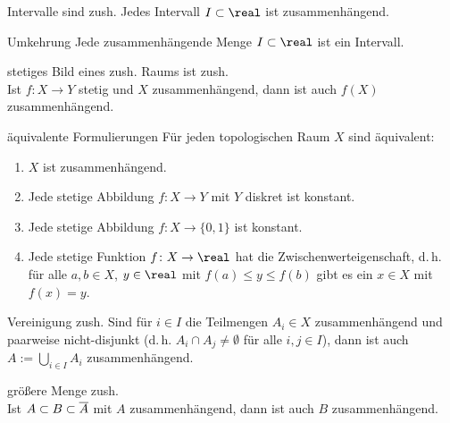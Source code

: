 \begin{Satz}{Intervalle sind zush.}
    Jedes Intervall $I \subset \real$ ist zusammenhängend.
\end{Satz}

\begin{Satz}{Umkehrung}
    Jede zusammenhängende Menge $I \subset \real$ ist ein Intervall.
\end{Satz}

\linie

\begin{Satz}{stetiges Bild eines zush. Raums ist zush.}\\
    Ist $f\colon X \rightarrow Y$ stetig und $X$ zusammenhängend,
    dann ist auch $f(X)$ zusammenhängend.
\end{Satz}

\begin{Satz}{äquivalente Formulierungen}
    Für jeden topologischen Raum $X$ sind äquivalent:
    \begin{enumerate}
        \item
        $X$ ist zusammenhängend.

        \item
        Jede stetige Abbildung $f\colon X \rightarrow Y$ mit $Y$ diskret
        ist konstant.

        \item
        Jede stetige Abbildung $f\colon X \rightarrow \{0, 1\}$
        ist konstant.

        \item
        Jede stetige Funktion $f\colon X \rightarrow \real$ hat die
        Zwischenwerteigenschaft, d.\,h.
        für alle $a, b \in X$, $y \in \real$ mit $f(a) \le y \le f(b)$ gibt
        es ein $x \in X$ mit $f(x) = y$.
    \end{enumerate}
\end{Satz}

\linie

\begin{Lemma}{Vereinigung zush.}
    Sind für $i \in I$ die Teilmengen $A_i \in X$ zusammenhängend und
    paarweise nicht-disjunkt
    (d.\,h. $A_i \cap A_j \not= \emptyset$ für alle $i, j \in I$),
    dann ist auch $A := \bigcup_{i \in I} A_i$ zusammenhängend.
\end{Lemma}

\begin{Lemma}{größere Menge zush.}\\
    Ist $A \subset B \subset \overline{A}$ mit $A$ zusammenhängend,
    dann ist auch $B$ zusammenhängend.
\end{Lemma}

